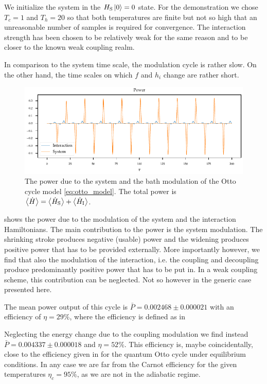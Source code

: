 We initialize the system in the \(H_{\mathrm{S}}\ket{0}=0\) state.  For the
demonstration we chose \(T_{c}=1\) and \(T_{h}=20\) so that both
temperatures are finite but not so high that an unreasonable number of
samples is required for convergence. The interaction strength has been
chosen to be relatively weak for the same reason and to be closer to
the known weak coupling realm.

In comparison to the system time scale, the modulation cycle is rather
slow. On the other hand, the time scales on which \(f\) and \(h_{i}\)
change are rather short.

\begin{figure}[ht]
  \centering
  \includegraphics{figs/otto/power}
  \caption{\label{fig:ottopower} The power due to the system and the
    bath modulation of the Otto cycle model \cref{eq:otto_model}. The
    total power is
    \(\ev{\dot{H}} = \ev{\dot{H}_{\sys}} + \ev{\dot{H}_{\inter}}\). }
\end{figure}
 shows the power due to the modulation of the
system and the interaction Hamiltonians. The main contribution to the
power is the system modulation. The shrinking stroke produces negative
(usable) power and the widening produces positive power that has to be
provided externally. More importantly however, we find that also the
modulation of the interaction, i.e. the coupling and decoupling
produce predominantly positive power that has to be put in. In a weak
coupling scheme, this contribution can be neglected. Not so however in
the generic case presented here.

The mean power output of this cycle is
\(\bar{P}=0.002468\pm 0.000021\) with an efficiency of
\(η=29\%\), where the efficiency is defined as in

Neglecting the energy change due to the coupling
modulation we find instead \(\bar{P}=0.004337\pm 0.000018\) and
\(η=52\%\).  This efficiency is, maybe coincidentally, close to the
efficiency given in \cite{Geva1992Feb} for the quantum Otto cycle
under equilibrium conditions. In any case we are far from the Carnot
efficiency for the given temperatures \(η_{c}=95\%\), as we are not in
the adiabatic regime.

